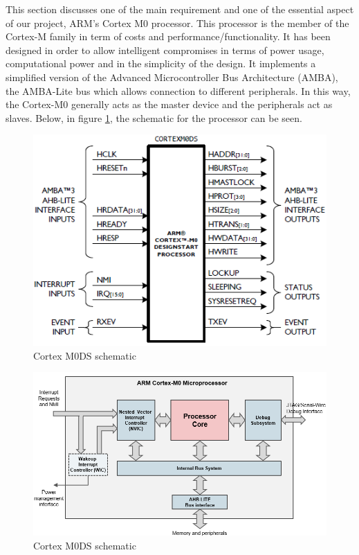 
This section discusses one of the main requirement and one of the essential aspect of our project, ARM’s Cortex M0 processor. This processor is the member of the Cortex-M family in term of costs and performance/functionality. It has been designed in order to allow intelligent compromises in terms of power usage, computational power and in the simplicity of the design. It implements a simplified version of the Advanced Microcontroller Bus Architecture (AMBA), the AMBA-Lite bus which allows connection to different peripherals. In this way, the Cortex-M0 generally acts as the master device and the peripherals act as slaves. Below, in figure \ref{fig:cortexm0ds}, the schematic for the processor can be seen.\\
\begin{figure}
\centering
\includegraphics[scale=0.7]{figures/cortexm0ds_schematic.PNG}
\caption{Cortex M0DS schematic \label{fig:cortexm0ds}}
\end{figure}
\clearpage

\begin{figure}
\centering
\includegraphics[scale=0.7]{figures/arm_cortexm0_microprocessor.PNG}
\caption{Cortex M0DS schematic \label{fig:cortex_block}}
\end{figure}

